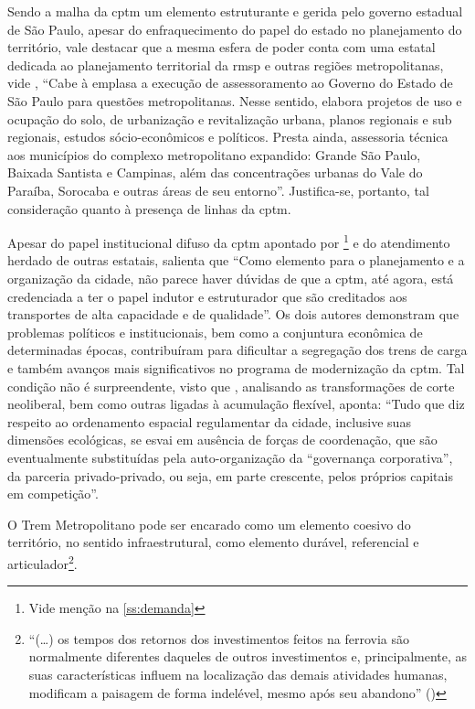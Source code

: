 \documentclass[11pt,fleqn]{book} %
\begin{document}
Sendo a malha da \gls{cptm} um elemento estruturante e gerida pelo governo estadual de São Paulo, apesar do enfraquecimento do papel do estado no planejamento do território, vale destacar que a mesma esfera de poder conta com uma estatal dedicada ao planejamento territorial da \gls{rmsp} e outras regiões metropolitanas, vide \cite[p. 224]{Stefani}, ``Cabe à \gls{emplasa} a execução de assessoramento ao Governo do Estado de São Paulo para questões metropolitanas. Nesse sentido, elabora projetos de uso e ocupação do solo, de urbanização e revitalização urbana, planos regionais e sub regionais, estudos sócio-econômicos e políticos. Presta ainda, assessoria técnica aos municípios do complexo metropolitano expandido: Grande São Paulo, Baixada Santista e Campinas, além das concentrações urbanas do Vale do Paraíba, Sorocaba e outras áreas de seu entorno''. Justifica-se, portanto, tal consideração quanto à presença de linhas da \gls{cptm}.

Apesar do papel institucional difuso da \gls{cptm} apontado por \cite{Isoda}\footnote{Vide menção na \autoref{ss:demanda}} e do atendimento herdado de outras estatais, \cite[pág. 97]{Ferreira} salienta que ``Como elemento para o planejamento e a organização da cidade, não parece haver dúvidas de que a \gls{cptm}, até agora, está credenciada a ter o papel indutor e estruturador que são creditados aos transportes de alta capacidade e de qualidade''. Os dois autores demonstram que problemas políticos e institucionais, bem como a conjuntura econômica de determinadas épocas, contribuíram para dificultar a segregação dos trens de carga e também avanços mais significativos no programa de modernização da \gls{cptm}. Tal condição não é surpreendente, visto que \cite[pág. 31]{Acselrad}, analisando as transformações de corte neoliberal, bem como outras ligadas à acumulação flexível, aponta: ``Tudo que diz respeito ao ordenamento	espacial regulamentar da cidade, inclusive suas dimensões ecológicas, se esvai em ausência	de forças de coordenação, que são eventualmente substituídas pela auto-organização da “governança corporativa”, da parceria privado-privado, ou seja, em parte crescente, pelos próprios capitais em competição''.

O Trem Metropolitano pode ser encarado como um elemento coesivo do território, no sentido infraestrutural, como elemento durável, referencial e articulador\footnote{``(\dots) os tempos dos retornos dos investimentos feitos na ferrovia são normalmente diferentes daqueles de outros investimentos e, principalmente, as suas características influem na localização das demais atividades humanas, modificam a paisagem de forma indelével, mesmo após seu abandono'' (\cite[pág. 13]{Ferreira})}.
\end{document}
